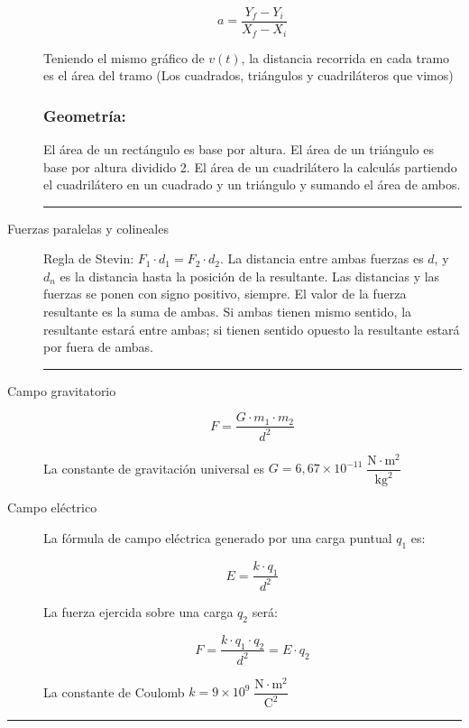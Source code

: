 \begin{description}
    \[a=\dfrac{Y_f - Y_i}{X_f - X_i}\]
    
    Teniendo el mismo gráfico de $v(t)$, la distancia recorrida en cada tramo es el área del tramo (Los cuadrados, triángulos y cuadriláteros que vimos)
    
    \subsubsection*{Geometría:}
    
    El área de un rectángulo es base por altura. El área de un triángulo es base por altura dividido 2. El área de un cuadrilátero la calculás partiendo el cuadrilátero en un cuadrado y un triángulo y sumando el área de ambos.
    \vspace{0.5cm}

    \hrule

    \item[Fuerzas paralelas y colineales]\hfil

    Regla de Stevin: $F_1 \cdot d_1 = F_2 \cdot d_2$. La distancia entre ambas fuerzas es $d$, y $d_n$ es la distancia hasta la posición de la resultante. Las distancias y las fuerzas se ponen con signo positivo, siempre. El valor de la fuerza resultante es la suma de ambas. Si ambas tienen mismo sentido, la resultante estará entre ambas; si tienen sentido opuesto la resultante estará por fuera de ambas.

\skipline
\hrule
\skipline

\item[Campo gravitatorio]\hfil
$$F = \dfrac{G\cdot m_1 \cdot m_2}{d^2}$$

La constante de gravitación universal es $G = 6,67\times 10^{-11}\;\dfrac{\text{N}\cdot \text{m}^2}{\text{kg}^2}$

\item[Campo eléctrico]\hfil

La fórmula de campo eléctrica generado por una carga puntual $q_1$ es:

$$E = \dfrac{k \cdot q_1}{d^2}$$

La fuerza ejercida sobre una carga $q_2$ será:

$$F = \dfrac{k\cdot q_1 \cdot q_2}{d^2} = E \cdot q_2$$ 

La constante de Coulomb $k = 9\times 10^{9}\;\dfrac{\text{N}\cdot \text{m}^2}{\text{C}^2}$

\end{description}

\skipline
\hrule
\skipline

